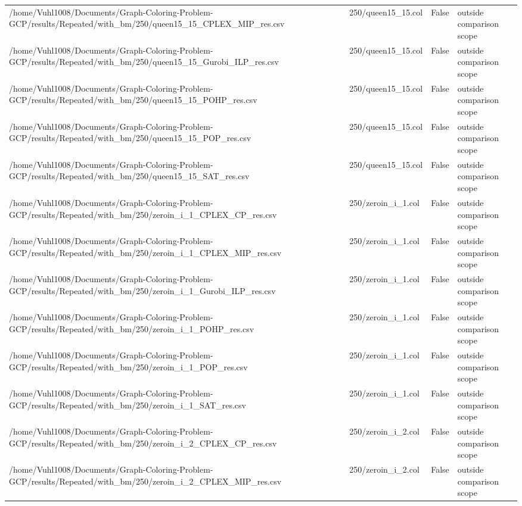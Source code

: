 \begin{table}[htbp]
\begin{tabular}{llll}
/home/Vuhl1008/Documents/Graph-Coloring-Problem-GCP/results/Repeated/with\_bm/250/queen15\_15\_CPLEX\_MIP\_res.csv & 250/queen15\_15.col & False & outside comparison scope \\
/home/Vuhl1008/Documents/Graph-Coloring-Problem-GCP/results/Repeated/with\_bm/250/queen15\_15\_Gurobi\_ILP\_res.csv & 250/queen15\_15.col & False & outside comparison scope \\
/home/Vuhl1008/Documents/Graph-Coloring-Problem-GCP/results/Repeated/with\_bm/250/queen15\_15\_POHP\_res.csv & 250/queen15\_15.col & False & outside comparison scope \\
/home/Vuhl1008/Documents/Graph-Coloring-Problem-GCP/results/Repeated/with\_bm/250/queen15\_15\_POP\_res.csv & 250/queen15\_15.col & False & outside comparison scope \\
/home/Vuhl1008/Documents/Graph-Coloring-Problem-GCP/results/Repeated/with\_bm/250/queen15\_15\_SAT\_res.csv & 250/queen15\_15.col & False & outside comparison scope \\
/home/Vuhl1008/Documents/Graph-Coloring-Problem-GCP/results/Repeated/with\_bm/250/zeroin\_i\_1\_CPLEX\_CP\_res.csv & 250/zeroin\_i\_1.col & False & outside comparison scope \\
/home/Vuhl1008/Documents/Graph-Coloring-Problem-GCP/results/Repeated/with\_bm/250/zeroin\_i\_1\_CPLEX\_MIP\_res.csv & 250/zeroin\_i\_1.col & False & outside comparison scope \\
/home/Vuhl1008/Documents/Graph-Coloring-Problem-GCP/results/Repeated/with\_bm/250/zeroin\_i\_1\_Gurobi\_ILP\_res.csv & 250/zeroin\_i\_1.col & False & outside comparison scope \\
/home/Vuhl1008/Documents/Graph-Coloring-Problem-GCP/results/Repeated/with\_bm/250/zeroin\_i\_1\_POHP\_res.csv & 250/zeroin\_i\_1.col & False & outside comparison scope \\
/home/Vuhl1008/Documents/Graph-Coloring-Problem-GCP/results/Repeated/with\_bm/250/zeroin\_i\_1\_POP\_res.csv & 250/zeroin\_i\_1.col & False & outside comparison scope \\
/home/Vuhl1008/Documents/Graph-Coloring-Problem-GCP/results/Repeated/with\_bm/250/zeroin\_i\_1\_SAT\_res.csv & 250/zeroin\_i\_1.col & False & outside comparison scope \\
/home/Vuhl1008/Documents/Graph-Coloring-Problem-GCP/results/Repeated/with\_bm/250/zeroin\_i\_2\_CPLEX\_CP\_res.csv & 250/zeroin\_i\_2.col & False & outside comparison scope \\
/home/Vuhl1008/Documents/Graph-Coloring-Problem-GCP/results/Repeated/with\_bm/250/zeroin\_i\_2\_CPLEX\_MIP\_res.csv & 250/zeroin\_i\_2.col & False & outside comparison scope \\

\end{tabular}
\end{table}
